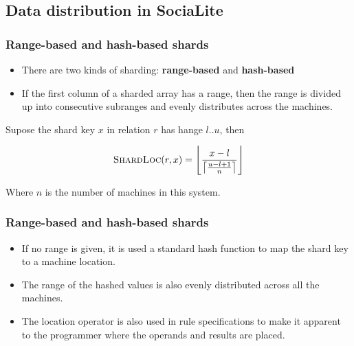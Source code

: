 \documentclass{beamer}
\begin{document}
\subsection{Data distribution in SociaLite}

\frame
{
	\frametitle{Range-based and hash-based shards}

	\begin{itemize}
		\item There are two kinds of sharding: \textbf{range-based} and \textbf{hash-based}
		\item If the first column of a sharded array has a range, then the range is divided up into consecutive subranges and evenly distributes across the machines.
	\end{itemize}
	
	Supose the shard key $x$ in relation $r$ has hange $l..u$, then	
	
	\begin{equation*}
		\textsc{ShardLoc}(r,x) =\left\lfloor\frac{x-l}{\left\lceil\frac{u-l+1}{n}\right\rceil}\right\rfloor
	\end{equation*}
	
	Where $n$ is the number of machines in this system.
}

\frame
{
	\frametitle{Range-based and hash-based shards}

	\begin{itemize}
		\item If no range is given, it is used a standard hash function to map the shard key to a machine location.
		\item The range of the hashed values is also evenly distributed across all the machines.
		\item The location operator is also used in rule specifications to make it apparent to the programmer where the operands and results are placed.
	\end{itemize}
	

}
\end{document}
